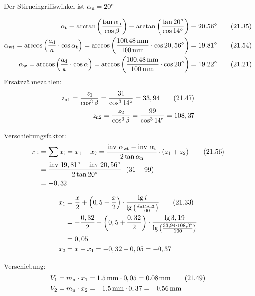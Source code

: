 \documentclass[15pt,a4paper]{article}
\begin{document}
	 Der Stirneingriffswinkel ist $\alpha_{\rm n} = 20^\circ$
	 
	 \begin{align}
		 \alpha_{\rm t} = \arctan\left( \frac{\tan \alpha_{\rm n}}{\cos \beta}\right) 
		 = \arctan\left( \frac{\tan 20^\circ}{\cos 14^\circ}\right) &= \ang{20,56}  \tag{21.35} \\
		 \alpha_{\rm wt}= \arccos\left( \frac{a_{\rm d}}{a}\cdot \cos \alpha_{\rm t} \right) =\arccos \left( \frac{\SI{100,48}{\milli\metre}}{\SI{100}{\milli\m}}\cdot \cos 20,56^\circ\right)  &= \ang{19,81}  \tag{21.54} \\
		 \alpha_{\rm w} = \arccos\left(\frac{a_{\rm d}}{a}\cdot \cos\alpha\right)
		 =\arccos\left(\frac{\SI{100,48}{\milli\metre}}{\SI{100}{\milli\m}}\cdot \cos 20^\circ \right) &= \ang{19,22} \tag{21.21} 
 	 \end{align}
	 Ersatzzähnezahlen:
	 \begin{align}
	 	z_{\rm n1} = \frac{z_1}{\cos^3 \beta} = \frac{31}{\cos^3 14^\circ} = 33,94 \tag{21.47}\\
	 	z_{\rm n2} = \frac{z_2}{\cos^3 \beta}= \frac{99}{\cos^3 14^\circ} = 108,37 \notag
	 \end{align}
 
	 Verschiebungsfaktor:
	 \begin{align}
	 	x :&= \sum x_i = x_1+ x_2 = \frac{\text{inv }\alpha_{\rm wt}-\text{inv }\alpha_{\rm t}}{2\tan \alpha_{\rm n}}\cdot \left( z_1 + z_2 \right) \tag{21.56}\\
	 	&=\frac{\text{inv }19,81^\circ -\text{inv }20,56 ^\circ}{2\tan 20^\circ}\cdot \left( 31+99 \right) \notag \\
	  	&= -0,32 \notag 
	\end{align}
	 
	 
	 \begin{align}
	 	x_1 &= \frac{x}{2}+\left( 0,5-\frac{x}{2}\right) \cdot \frac{\lg i}{\lg \left( \frac{z_{\rm n1} \cdot z_{\rm n2}}{100}\right) }  \tag{21.33} \\
	 	 &= -\frac{0,32}{2}+\left( 0,5+\frac{0,32}{2}\right) \cdot \frac{\lg 3,19}{\lg \left( \frac{33,94 \cdot 108,37}{100}\right) } \notag \\
	 	 &= 0,05 \notag \\
	 	x_2 &= x -x_1 = -0,32 - 0,05	= -0,37 \notag
	 \end{align}
 	 
	 Verschiebung:
	 \begin{align}
	 	V_1 &= m_{\rm n} \cdot x_1 = \SI{1,5}{\milli\metre} \cdot 0,05 =  \SI{0,08}{\milli\m} \tag{21.49} \\	 	
	 	V_2 &= m_{\rm n} \cdot x_2 = -\SI{1,5}{\milli\metre} \cdot 0,37 = \SI{-0,56}{\milli\m} \notag
	 \end{align}
	 
\end{document}
